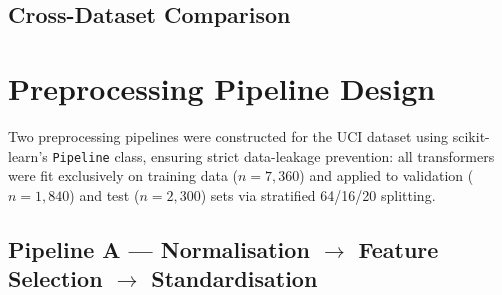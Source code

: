 \documentclass[conference]{IEEEtran}
\begin{document}
\subsection{Cross-Dataset Comparison}

\begin{table}[H]
  \centering
  \caption{Cross-Dataset Comparison Summary}
  \label{tab:crossdataset}
\end{table}

\section{Preprocessing Pipeline Design}
\label{sec:pipelines}

Two preprocessing pipelines were constructed for the UCI dataset using
scikit-learn's \texttt{Pipeline} class, ensuring strict data-leakage
prevention: all transformers were fit exclusively on training data
($n{=}7{,}360$) and applied to validation ($n{=}1{,}840$) and test
($n{=}2{,}300$) sets via stratified 64/16/20 splitting.

\subsection{Pipeline A --- Normalisation $\rightarrow$ Feature Selection
$\rightarrow$ Standardisation}
\end{document}
